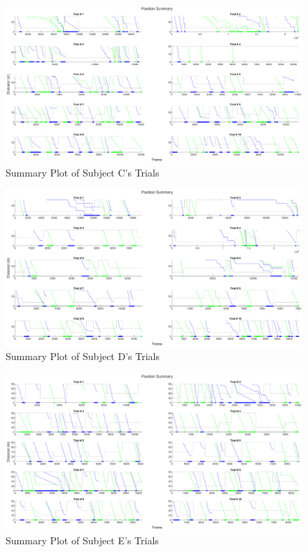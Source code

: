 \begin{appendices}
\begin{figure}[hbt!]
    \centering
    \includegraphics[width=\linewidth, height=\plotHeight\linewidth]{figures/subject_c_summary.eps}
    \caption{Summary Plot of Subject C's Trials}
    \label{fig:SumC}
\end{figure}

\begin{figure}[hbt!]
    \centering
    \includegraphics[width=\linewidth, height=\plotHeight\linewidth]{figures/subject_d_summary.eps}
    \caption{Summary Plot of Subject D's Trials}
    \label{fig:SumD}
\end{figure}

\begin{figure}[hbt!]
    \centering
    \includegraphics[width=\linewidth, height=\plotHeight\linewidth]{figures/subject_e_summary.eps}
    \caption{Summary Plot of Subject E's Trials}
    \label{fig:SumE}
\end{figure}


\end{appendices}

